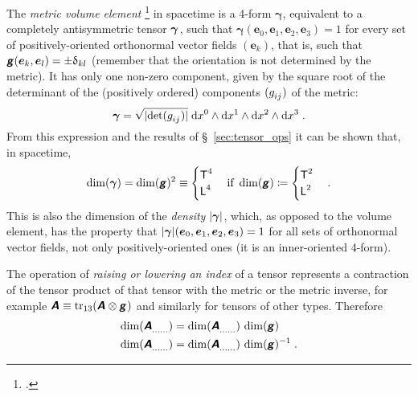 \documentclass[a4paper,12pt,onecolumn,oneside,article,british]{memoir}
\makeatletter
\newcommand*{\mathte}[1]{\textbf{\textit{\textsf{#1}}}}
\newcommand*{\citep}{\footcites}
\newcommand*{\delt}{\updelta}%
\newcommand*{\di}{\mathrm{d}}%
\DeclareMathOperator{\tr}{tr}%
\newcommand*{\defd}{\coloneqq}
\DeclarePairedDelimiter\abs{\lvert}{\rvert}
\newcommand*{\sect}{\S}%
\newcommand*{\q}{}%
\DeclareRobustCommand*{\q}{%
  \mathbin{\mathpalette\bigcdot@{}}%
}
\newcommand*{\bigcdot@scalefactor}{0.7}
\newcommand*{\bigcdot@widthfactor}{1.5}
\newcommand*{\bigcdot@}[2]{%
  \sbox0{$#1\vcenter{}$}%
  \sbox2{$#1\cdot\m@th$}%
  \hbox to \bigcdot@widthfactor\wd2{%
    \hfil
    \raise\ht0\hbox{%
      \scalebox{\bigcdot@scalefactor}{%
        \lower\ht0\hbox{$#1\bullet\m@th$}%
      }%
    }%
    \hfil
  }%
}
\newcommand*{\Le}{\textsf{L}}
\newcommand*{\Ti}{\textsf{T}}
\newcommand*{\yA}{\mathte{A}}
\newcommand*{\yg}{\mathte{g}}
\renewcommand*{\i}{\indices}
\newcommand*{\dix}[1][i]{\di x^{#1}}
\newcommand*{\ye}{\bm{e}}
\newcommand*{\ygv}{\bm{\gamma}}
\makeatother
\begin{document}
\medskip

The \emph{metric volume element} \citep[\sect~6.2]{abrahametal1983_r1988}
in spacetime is a 4-form $\ygv$, equivalent to a completely antisymmetric
tensor $\ygv\i{_{\q\q\q\q}}$, such that
$\ygv(\ye_{0},\ye_{1},\ye_{2},\ye_{3})=1$ for every set of
positively-oriented orthonormal vector fields $(\ye_{k})$, that is, such
that $\yg(\ye_{k},\ye_{l})=\pm\delt_{kl}$ (remember that the orientation is
not determined by the metric). It has only one non-zero 
component, given by the square root of the determinant of the (positively
ordered) components $(g\i{_{ij}})$ of the metric:
\begin{equation}
  \label{eq:volume_elem}
  \ygv =
  \sqrt{\smash[b]{\abs{\det(g\i{_{ij}})}}}\;\dix[0]\land\dix[1]\land\dix[2]\land\dix[3] \;.
\end{equation}
From this expression and the results of \sect~\ref{sec:tensor_ops} it can
be shown that, in spacetime,
\begin{equation}
  \label{eq:dim_volume_elem}
  \dim(\ygv) = \dim(\yg)^{2} \equiv
    \begin{cases}
    \Ti^{4} \\
    \Le^{4}
  \end{cases}
  \text{if }\dim(\yg)\defd
  \begin{cases}
     \Ti^2 \\
    \Le^2
  \end{cases}.
\end{equation}
This is also the dimension of the \emph{density} $\abs{\ygv}$, which, as
opposed to the volume element, has the property that
$\abs{\ygv}(\ye_{0},\ye_{1},\ye_{2},\ye_{3})=1$ for all sets of orthonormal
vector fields, not only positively-oriented ones (it is an inner-oriented
4-form).

\medskip

The operation of \emph{raising or lowering an index} of a tensor represents a
contraction of the tensor product of that tensor with the metric or the
metric inverse, for example
$\yA\i{_{\q\q}} \equiv
\tr_{13}(\yA\i{^{\q}_{\q}}\otimes\yg\i{_{\q\q}})$ and similarly
for tensors of other types. Therefore
\begin{equation}
  \label{eq:raising_lowering}
  \begin{split}
  \dim(\yA\i{_{\dotso}_{\q}_{\dotso}}) &=
  \dim(\yA\i{_{\dotso}^{\q}_{\dotso}})\,\dim(\yg)
\\
  \dim(\yA\i{_{\dotso}^{\q}_{\dotso}}) &=
  \dim(\yA\i{_{\dotso}_{\q}_{\dotso}})\,\dim(\yg)^{-1} \;.
\end{split}
\end{equation}
\end{document}
